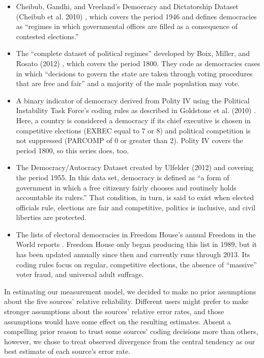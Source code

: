 \documentclass[letterpaper]{article}
\begin{document}
\begin{itemize}
\item Cheibub, Gandhi, and Vreeland’s Democracy and Dictatorship Dataset (Cheibub et al. 2010) \cite{cheibub}, which covers the period 1946 and defines democracies as “regimes in which governmental offices are filled as a consequence of contested elections.”
\item The “complete dataset of political regimes” developed by Boix, Miller, and Rosato (2012) \cite{boix}, which covers the period 1800. They code as democracies cases in which “decisions to govern the state are taken through voting procedures that are free and fair” and a majority of the male population may vote. 
\item A binary indicator of democracy derived from Polity IV using the Political Instability Task Force’s coding rules as described in Goldstone et al. (2010) \cite{pitf}. Here, a country is considered a democracy if its chief executive is chosen in competitive elections (EXREC equal to 7 or 8) and political competition is not suppressed (PARCOMP of 0 or greater than 2). Polity IV covers the period 1800, so this series does, too.
\item The Democracy/Autocracy Dataset created by Ulfelder (2012) \cite{ulfelder} and covering the period 1955. In this data set, democracy is defined as “a form of government in which a free citizenry fairly chooses and routinely holds accountable its rulers.” That condition, in turn, is said to exist when elected officials rule, elections are fair and competitive, politics is inclusive, and civil liberties are protected.
\item The lists of electoral democracies in Freedom House’s annual Freedom in the World reports \cite{fh}. Freedom House only began producing this list in 1989, but it has been updated annually since then and currently runs through 2013. Its coding rules focus on regular, competitive elections, the absence of “massive” voter fraud, and universal adult suffrage.
\end{itemize}

In estimating our measurement model, we decided to make no prior assumptions about the five sources’ relative reliability. Different users might prefer to make stronger assumptions about the sources’ relative error rates, and those assumptions would have some effect on the resulting estimates. Absent a compelling prior reason to trust some sources’ coding decisions more than others, however, we chose to treat observed divergence from the central tendency as our best estimate of each source’s error rate.
\end{document}
